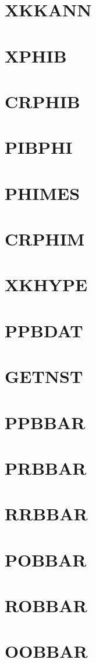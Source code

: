 \documentclass[10pt,UTF8]{ctexbook}
\begin{document}
\section{XKKANN}
\section{XPHIB}
\section{CRPHIB}
\section{PIBPHI}
\section{PHIMES}
\section{CRPHIM}
\section{XKHYPE}
\section{PPBDAT}
\section{GETNST}
\section{PPBBAR}
\section{PRBBAR}
\section{RRBBAR}
\section{POBBAR}
\section{ROBBAR}
\section{OOBBAR}
\end{document}
